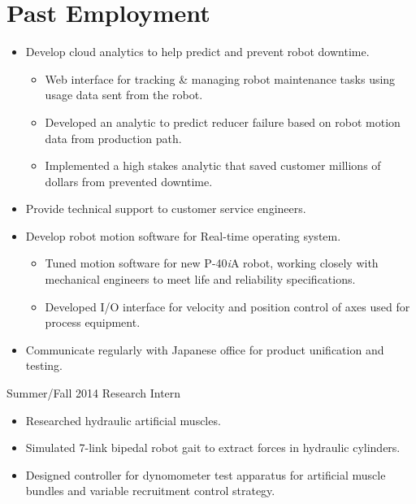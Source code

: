 \documentclass{BradyResume}
\begin{document}
\section*{Past Employment}
\begin{itemize}
  \item Develop cloud analytics to help predict and prevent robot downtime.
  \begin{itemize}
    \item Web interface for tracking \& managing robot maintenance tasks using usage data sent from the robot.
    \item Developed an analytic to predict reducer failure based on  robot motion data from production path.
    \item Implemented a high stakes analytic that saved customer millions of dollars from prevented downtime.
  \end{itemize}
  \item Provide technical support to customer service engineers.
  \item Develop robot motion software for Real-time operating system.
  \begin{itemize}
	  \item Tuned motion software for new P-40{\it{i}}A robot, working closely with mechanical engineers to meet life and reliability specifications.
	  \item Developed I/O interface for velocity and position control of axes used for process equipment.
  \end{itemize}
  \item Communicate regularly with Japanese office for product unification and testing.

\end{itemize}
%
           {Summer/Fall 2014}%
           {Research Intern}
\begin{itemize}
  \item Researched hydraulic artificial muscles.
  \item Simulated 7-link bipedal robot gait to extract forces in hydraulic cylinders.
  \item Designed controller for dynomometer test apparatus for artificial muscle bundles and variable recruitment control strategy.
\end{itemize}
\end{document}
